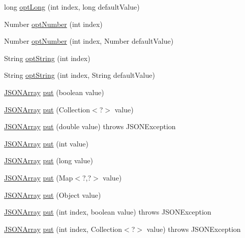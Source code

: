 \begin{DoxyCompactItemize}
long \hyperlink{classorg_1_1json_1_1JSONArray_a2c6ccec4ce5ab42e192e5686bc0ac03b}{opt\-Long} (int index, long default\-Value)
\item 
Number \hyperlink{classorg_1_1json_1_1JSONArray_a0631e0440650687e8ac05c8433d0478f}{opt\-Number} (int index)
\item 
Number \hyperlink{classorg_1_1json_1_1JSONArray_a36bd582b05c3bf4a941d30a055331f0f}{opt\-Number} (int index, Number default\-Value)
\item 
String \hyperlink{classorg_1_1json_1_1JSONArray_aae00b0b37711915293a389a597f4adf7}{opt\-String} (int index)
\item 
String \hyperlink{classorg_1_1json_1_1JSONArray_a81407977272f634afe7d278ecb9c44b5}{opt\-String} (int index, String default\-Value)
\item 
\hyperlink{classorg_1_1json_1_1JSONArray}{J\-S\-O\-N\-Array} \hyperlink{classorg_1_1json_1_1JSONArray_a54cc64e03735749abb69a05cf5b3ed68}{put} (boolean value)
\item 
\hyperlink{classorg_1_1json_1_1JSONArray}{J\-S\-O\-N\-Array} \hyperlink{classorg_1_1json_1_1JSONArray_a4425988cb87aff93f6b7178392027d48}{put} (Collection$<$?$>$ value)
\item 
\hyperlink{classorg_1_1json_1_1JSONArray}{J\-S\-O\-N\-Array} \hyperlink{classorg_1_1json_1_1JSONArray_a0640a8fabd23294c4972a7884b1e3714}{put} (double value)  throws J\-S\-O\-N\-Exception 
\item 
\hyperlink{classorg_1_1json_1_1JSONArray}{J\-S\-O\-N\-Array} \hyperlink{classorg_1_1json_1_1JSONArray_a86a8ba6ff68f50faaad5c7070ef91f64}{put} (int value)
\item 
\hyperlink{classorg_1_1json_1_1JSONArray}{J\-S\-O\-N\-Array} \hyperlink{classorg_1_1json_1_1JSONArray_a3dd194b7438a41505fe1ff4cee0cd3fd}{put} (long value)
\item 
\hyperlink{classorg_1_1json_1_1JSONArray}{J\-S\-O\-N\-Array} \hyperlink{classorg_1_1json_1_1JSONArray_ab03fe6cb26c02a1223849055bf824150}{put} (Map$<$?,?$>$ value)
\item 
\hyperlink{classorg_1_1json_1_1JSONArray}{J\-S\-O\-N\-Array} \hyperlink{classorg_1_1json_1_1JSONArray_a184c04f20d200b83da5f70c05651949c}{put} (Object value)
\item 
\hyperlink{classorg_1_1json_1_1JSONArray}{J\-S\-O\-N\-Array} \hyperlink{classorg_1_1json_1_1JSONArray_a40deb37f82b54a44476a6a162ba55864}{put} (int index, boolean value)  throws J\-S\-O\-N\-Exception 
\item 
\hyperlink{classorg_1_1json_1_1JSONArray}{J\-S\-O\-N\-Array} \hyperlink{classorg_1_1json_1_1JSONArray_a34ac3c9f6aa2f4d5bd2a47ff2ef65149}{put} (int index, Collection$<$?$>$ value)  throws J\-S\-O\-N\-Exception 

\end{DoxyCompactItemize}
